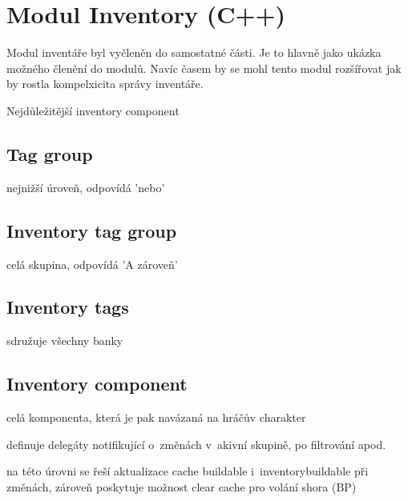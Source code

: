 


\section{Modul Inventory (C++)}

Modul inventáře byl vyčleněn do samostatné části. Je to hlavně jako ukázka možného členění do modulů. Navíc časem by se mohl tento modul rozšířovat jak by rostla kompelxicita správy inventáře.

Nejdůležitější inventory component


\subsection{Tag group}
nejnižší úroveň, odpovídá 'nebo'

\subsection{Inventory tag group}

celá skupina, odpovídá 'A zároveň'

\subsection{Inventory tags}

sdružuje všechny banky

\subsection{Inventory component}

celá komponenta, která je pak navázaná na hráčův charakter

definuje delegáty notifikující o~změnách v~akivní skupině, po filtrování apod.

na této úrovni se řeší aktualizace cache buildable i~inventorybuildable při změnách, zároveň poskytuje možnost clear cache pro volání shora (BP)

